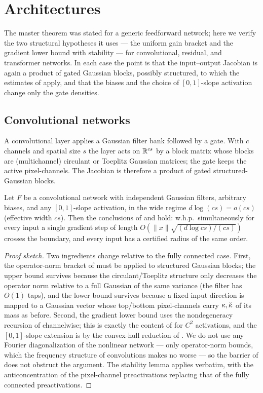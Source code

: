 \section{Architectures}\label{sec:arch}

The master theorem was stated for a generic feedforward network; here we verify the two structural
hypotheses it uses --- the uniform gain bracket and the gradient lower bound with stability --- for
convolutional, residual, and transformer networks. In each case the point is that the input--output
Jacobian is again a product of gated Gaussian blocks, possibly structured, to which the estimates of
 apply, and that the biases and the choice of $[0,1]$-slope activation change only the
gate densities.

\subsection{Convolutional networks}
A convolutional layer applies a Gaussian filter bank followed by a gate. With $c$ channels and spatial
size $s$ the layer acts on $\mathbb{R}^{cs}$ by a block matrix whose blocks are (multichannel) circulant or
Toeplitz Gaussian matrices; the gate keeps the active pixel-channels. The Jacobian is therefore a
product of gated structured-Gaussian blocks.

\begin{theorem}\label{thm:cnn}
Let $F$ be a convolutional network with independent Gaussian filters, arbitrary biases, and any
$[0,1]$-slope activation, in the wide regime $d\log(cs)=o(cs)$ (effective width $cs$). Then the
conclusions of  and  hold: w.h.p.\ simultaneously for every
input a single gradient step of length $O(\|x\|\sqrt{(d\log cs)/(cs)})$ crosses the boundary, and every
input has a certified radius of the same order.
\end{theorem}

\begin{proof}[Proof sketch]
Two ingredients change relative to the fully connected case. First, the operator-norm bracket of
 must be applied to structured Gaussian blocks; the upper bound survives because the
circulant/Toeplitz structure only decreases the operator norm relative to a full Gaussian of the same
variance (the filter has $O(1)$ taps), and the lower bound survives because a fixed input direction is
mapped to a Gaussian vector whose top/bottom pixel-channels carry $\kappa,\check{\kappa}$ of its mass as
before. Second, the gradient lower bound uses the nondegeneracy recursion of 
channelwise; this is exactly the content of \cite{danielyM26} for $C^2$ activations, and the
$[0,1]$-slope extension is by the convex-hull reduction of . We do not use any Fourier
diagonalization of the nonlinear network --- only operator-norm bounds, which the frequency structure of
convolutions makes no worse --- so the barrier of \cite[Rem 10.2]{advExt} does not obstruct the argument.
The stability lemma  applies verbatim, with the anticoncentration of the
pixel-channel preactivations replacing that of the fully connected preactivations.
\end{proof}

